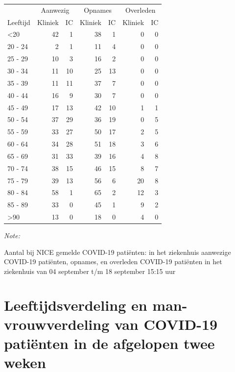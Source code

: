 \documentclass[
  english,
  man,floatsintext]{apa6}
\begin{document}
\begin{table}
\centering\begingroup\fontsize{10}{12}\selectfont

\begin{threeparttable}
\begin{tabular}{lrrrrrr}
\toprule
\multicolumn{1}{c}{ } & \multicolumn{2}{c}{Aanwezig} & \multicolumn{2}{c}{Opnames} & \multicolumn{2}{c}{Overleden} \\
\cmidrule(l{3pt}r{3pt}){2-3} \cmidrule(l{3pt}r{3pt}){4-5} \cmidrule(l{3pt}r{3pt}){6-7}
Leeftijd & Kliniek & IC & Kliniek & IC & Kliniek & IC\\
\midrule
<20 & 42 & 1 & 38 & 1 & 0 & 0\\
20 - 24 & 2 & 1 & 11 & 4 & 0 & 0\\
25 - 29 & 10 & 3 & 16 & 2 & 0 & 0\\
30 - 34 & 11 & 10 & 25 & 13 & 0 & 0\\
35 - 39 & 11 & 11 & 37 & 7 & 0 & 0\\
40 - 44 & 16 & 9 & 30 & 7 & 0 & 0\\
45 - 49 & 17 & 13 & 42 & 10 & 1 & 1\\
50 - 54 & 37 & 29 & 36 & 19 & 0 & 5\\
55 - 59 & 33 & 27 & 50 & 17 & 2 & 5\\
60 - 64 & 34 & 28 & 51 & 18 & 3 & 6\\
65 - 69 & 31 & 33 & 39 & 16 & 4 & 8\\
70 - 74 & 38 & 15 & 46 & 15 & 8 & 7\\
75 - 79 & 39 & 13 & 56 & 6 & 20 & 8\\
80 - 84 & 58 & 1 & 65 & 2 & 12 & 3\\
85 - 89 & 33 & 0 & 45 & 1 & 9 & 2\\
>90 & 13 & 0 & 18 & 0 & 4 & 0\\
\bottomrule
\end{tabular}
\begin{tablenotes}
\item \textit{Note: } 
\item Aantal bij NICE gemelde COVID-19 patiënten: in het ziekenhuis aanwezige COVID-19 patiënten, opnames, en overleden COVID-19 patiënten in het ziekenhuis van 04 september t/m 18 september 15:15 uur
\end{tablenotes}
\end{threeparttable}
\endgroup{}
\end{table}

\newpage

\hypertarget{leeftijdsverdeling-en-man-vrouwverdeling-van-covid-19-patiuxebnten-in-de-afgelopen-twee-weken}{%
\section{Leeftijdsverdeling en man-vrouwverdeling van COVID-19 patiënten in de afgelopen twee weken}\label{leeftijdsverdeling-en-man-vrouwverdeling-van-covid-19-patiuxebnten-in-de-afgelopen-twee-weken}}
\end{document}
